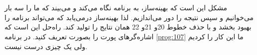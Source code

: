 \section{}
\paragraph{}\label{answer:9}
مشکل این است که بهینه‌ساز، به برنامه نگاه می‌کند و می‌بیند که ما  را سه بار می‌خوانیم و سپس نتیجه را دور می‌اندازیم. لذا بهینه‌ساز درمی‌یابد که می‌تواند برنامه را بهبود بخشد و با حذف خطوط 20و 21و 22 همان نتایج را تولید کند. راه‌حل این است که اشاره‌گرهای پورت را بصورت  تعریف کنید. در برنامه \ref{prog:107} ما این کار را کردیم ولی یک چیزی درست نیست.